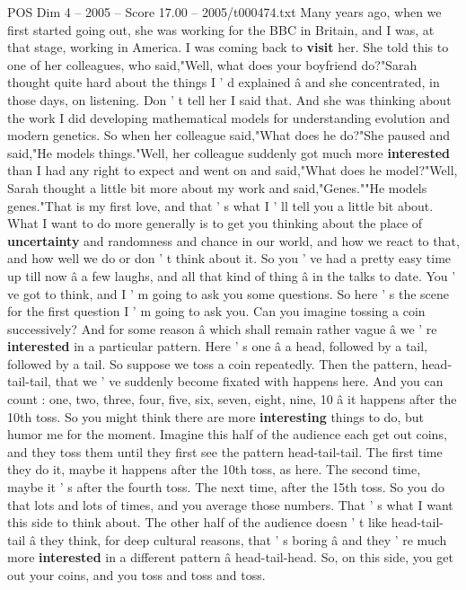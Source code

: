 \begin{textsample}{POS Dim 4 – 2005 – Score 17.00 – 2005/t000474.txt}
Many years ago, when we first started going out, she was working for the BBC in Britain, and I was, at that stage, working in America.
I was coming back to \textbf{visit} her.
She told this to one of her colleagues, who said,"Well, what does your boyfriend do?"Sarah thought quite hard about the things I ' d explained â and she concentrated, in those days, on listening.
Don ' t tell her I said that.
And she was thinking about the work I did developing mathematical models for understanding evolution and modern genetics.
So when her colleague said,"What does he do?"She paused and said,"He models things."Well, her colleague suddenly got much more \textbf{interested} than I had any right to expect and went on and said,"What does he model?"Well, Sarah thought a little bit more about my work and said,"Genes.""He models genes."That is my first love, and that ' s what I ' ll tell you a little bit about.
What I want to do more generally is to get you thinking about the place of \textbf{uncertainty} and randomness and chance in our world, and how we react to that, and how well we do or don ' t think about it.
So you ' ve had a pretty easy time up till now â a few laughs, and all that kind of thing â in the talks to date.
You ' ve got to think, and I ' m going to ask you some questions.
So here ' s the scene for the first question I ' m going to ask you.
Can you imagine tossing a coin successively?
And for some reason â which shall remain rather vague â we ' re \textbf{interested} in a particular pattern.
Here ' s one â a head, followed by a tail, followed by a tail.
So suppose we toss a coin repeatedly.
Then the pattern, head-tail-tail, that we ' ve suddenly become fixated with happens here.
And you can count : one, two, three, four, five, six, seven, eight, nine, 10 â it happens after the 10th toss.
So you might think there are more \textbf{interesting} things to do, but humor me for the moment.
Imagine this half of the audience each get out coins, and they toss them until they first see the pattern head-tail-tail.
The first time they do it, maybe it happens after the 10th toss, as here.
The second time, maybe it ' s after the fourth toss.
The next time, after the 15th toss.
So you do that lots and lots of times, and you average those numbers.
That ' s what I want this side to think about.
The other half of the audience doesn ' t like head-tail-tail â they think, for deep cultural reasons, that ' s boring â and they ' re much more \textbf{interested} in a different pattern â head-tail-head.
So, on this side, you get out your coins, and you toss and toss and toss.

\end{textsample}
